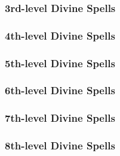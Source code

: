 \subsubsection{3rd-level Divine Spells}
\begin{spelllist}
    \SLagony
    \SLcalmemotions
    \SLcommand
    \SLdeathknell
    \SLdiscernvulnerability
    \SLdispelmagic
    \SLdivinefavor
    \SLmightythrow
\end{spelllist}

\subsubsection{4th-level Divine Spells}
\begin{spelllist}
    \SLairwalk
    \SLavatarofhealing
    \SLbladebarrier
    \SLconfusion
    \SLdeathward
    \SLenervation
    \SLmarkofscrying
    \SLpoison
\end{spelllist}

\subsubsection{5th-level Divine Spells}
\begin{spelllist}
    \SLblasphemy
    \SLcacaphonicword
    \SLcircleofdeath
    \SLcircleofhealing
    \SLdictum
    \SLdivinemight
    \SLflamestrike
    \SLholyword
    \SLrevivify
    \SLspiritualweapon
\end{spelllist}

\subsubsection{6th-level Divine Spells}
\begin{spelllist}
    \SLblessedblade
    \SLheal
    \SLtrueseeing
    \SLwordofrecall
\end{spelllist}

\subsubsection{7th-level Divine Spells}
\begin{spelllist}
    \SLantimagicfield
    \SLantilifeshell
    \SLavataroffealty
    \SLavatarofshielding
    \SLdivinejudgment
    \SLdivineshield
\end{spelllist}

\subsubsection{8th-level Divine Spells}
\begin{spelllist}
    \SLavatarofsuffering
    \SLmartyrsgift
\end{spelllist}

